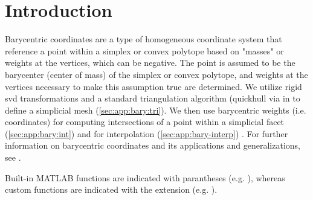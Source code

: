 \documentclass[final,12pt]{elsarticle}
\begin{document}
\section{Introduction}
Barycentric coordinates are a type of homogeneous coordinate system that reference a \outpt{} point within a simplex \cite{langerSphericalBarycentricCoordinates2006} or convex polytope \cite{floaterGeneralizedBarycentricCoordinates2015,meyerGeneralizedBarycentricCoordinates2002,langerSphericalBarycentricCoordinates2006} based on "masses" or weights at the vertices, which can be negative. The \outpt{} point is assumed to be the barycenter (center of mass) of the simplex or convex polytope, and weights at the vertices necessary to make this assumption true are determined. We utilize rigid \gls{svd} transformations and a standard triangulation algorithm (quickhull \cite{barberQuickhullAlgorithmConvex1996} via  in  to define a simplicial mesh (\cref{sec:app:bary:tri}). We then use barycentric weights (i.e. coordinates) for computing intersections of a point within a simplicial facet (\cref{sec:app:bary:int}) and for interpolation (\cref{sec:app:bary-interp}) \cite{langerSphericalBarycentricCoordinates2006}. For further information on barycentric coordinates and its applications and generalizations, see \cite{anisimovSubdividingBarycentricCoordinates2016,budninskiyPowerCoordinatesGeometric2016,dyerBarycentricCoordinateNeighbourhoods2016,floaterGeneralizedBarycentricCoordinates2015,floaterInjectivityWachspressMean2010,hormannDiscretizingWachspressKernels2017,hormannMaximumEntropyCoordinates2008,langerHigherOrderBarycentric2008,langerSphericalBarycentricCoordinates2006,leiNewCoordinateSystem2020,meyerGeneralizedBarycentricCoordinates2002,peixotoVectorFieldReconstructions2014,pihajokiBarycentricInterpolationRiemannian2019,rustamovBarycentricCoordinatesSurfaces2010,skalaRobustBarycentricCoordinates2013,taoFastNumericalSolver2019,warrenBarycentricCoordinatesConvex2007}.

Built-in MATLAB functions are indicated with parantheses (e.g. ), whereas custom functions are indicated with the  extension (e.g. ).
%
%
\end{document}
